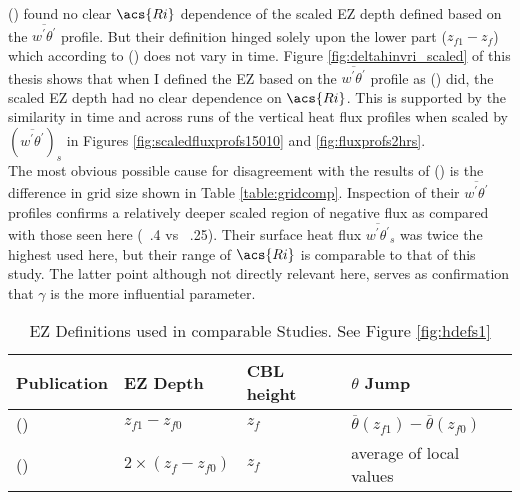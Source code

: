  \citeauthor{BrooksFowler2} (\citeyear{BrooksFowler2}) found no clear $\acs{Ri}$ dependence of the scaled \acs{EZ} depth defined based on the $\overline{w^{'}\theta^{'}}$ profile.  But their definition hinged solely upon the lower part ($z_{f1} - z_{f}$) which according to \citeauthor{FedConzMir04} (\citeyear{FedConzMir04}) does not vary in time.  Figure \ref{fig:deltahinvri_scaled} of this thesis shows that when I defined the \acs{EZ} based on the $\overline{w^{'}\theta^{'}}$ profile as \citeauthor{FedConzMir04} (\citeyear{FedConzMir04}) did, the scaled \acs{EZ} depth had no clear dependence on $\acs{Ri}$. This is supported by the similarity in time and across runs of the vertical heat flux profiles when scaled by $(\overline{w^{'}\theta^{'}})_{s}$ in Figures \ref{fig:scaledfluxprofs15010} and \ref{fig:fluxprofs2hrs}.\\

The most obvious possible cause for disagreement with the results of \citeauthor{FedConzMir04} (\citeyear{FedConzMir04}) is the difference in grid size shown in Table \ref{table:gridcomp}.  Inspection of their $\overline{w^{'}\theta^{'}}$ profiles confirms a relatively deeper scaled region of negative flux as compared with those seen here (~.4 vs ~.25). Their surface heat flux $\overline{w^{'}\theta^{'}}_{s}$ was twice the highest used here, but their range of $\acs{Ri}$ is comparable to that of this study.  The latter point although not directly relevant here, serves as confirmation that $\gamma$ is the more influential parameter.\\              

\begin{table}[htbp]
\label{table:elandri}
\caption[\acs{EZ} Definitions used in comparable Studies]{\acs{EZ} Definitions used in comparable Studies.  See Figure \ref{fig:hdefs1}}

\begin{center}
\begin{tabular}{ p{4cm} p{2cm} p{1.5cm} p{3cm}}

Publication & \acs{EZ} Depth & \acs{CBL} height & $\theta$ Jump\\ \hline
\citeauthor{FedConzMir04} (\citeyear{FedConzMir04}) & $z_{f1} - z_{f0}$ & $z_{f}$ &  $\overline{\theta}(z_{f1})-\overline{\theta}(z_{f0})$\\ [.3cm] %
\citeauthor{BrooksFowler2} (\citeyear{BrooksFowler2}) & $2 \times (z_{f} - z_{f0})$ & $z_{f}$ & average of local values\\ \hline

\end{tabular}
\end{center}    
\end{table}

